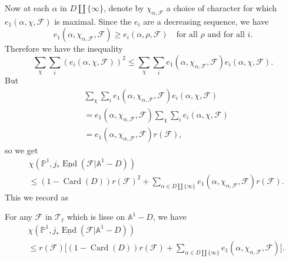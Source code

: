 Now at each \(\alpha\) in \(D\amalg\{\infty\}\), denote by
\(\chi_{\alpha,\mathcal{F}}\) a choice of character for which
\(e_1(\alpha,\chi,\mathcal{F})\) is maximal. Since the \(e_i\) are a
decreasing sequence, we have
\[
  e_1(\alpha,\chi_{\alpha,\mathcal{F}},\mathcal{F})
  \geq e_i(\alpha,\rho,\mathcal{F})\quad
  \text{for all \(\rho\) and for all \(i\)}.
\]
Therefore we have the inequality
\[
  \sum_\chi\sum_i(e_i(\alpha,\chi,\mathcal{F}))^2
  \leq
  \sum_\chi\sum_i
  e_1(\alpha,\chi_{\alpha,\mathcal{F}},\mathcal{F})
  e_i(\alpha,\chi,\mathcal{F}).
\]
But
\[
\begin{aligned}
  &\sum_\chi\sum_i
  e_1(\alpha,\chi_{\alpha,\mathcal{F}},\mathcal{F})
  e_i(\alpha,\chi,\mathcal{F})\\
  &=
  e_1(\alpha,\chi_{\alpha,\mathcal{F}},\mathcal{F})
  \sum_\chi\sum_i e_i(\alpha,\chi,\mathcal{F})\\
  &=e_1(\alpha,\chi_{\alpha,\mathcal{F}},\mathcal{F})r(\mathcal{F}),
\end{aligned}
\]
so we get
\[
\begin{aligned}
  &\chi(\mathbb{P}^1,j_*\underline{\operatorname{End}}(\mathcal{F}\vert\mathbb{A}^1-D))\\
  &\leq
  (1-\operatorname{Card}(D))r(\mathcal{F})^2
  +
  \sum_{\alpha\in D\amalg\{\infty\}}
  e_1(\alpha,\chi_{\alpha,\mathcal{F}},\mathcal{F})r(\mathcal{F}).
\end{aligned}
\]
This we record as

For any \(\mathcal{F}\) in \(\mathcal{T}_\ell\) which is lisse on
\(\mathbb{A}^1-D\), we have
\[
\begin{aligned}
  &\chi(\mathbb{P}^1,j_*\underline{\operatorname{End}}(\mathcal{F}\vert\mathbb{A}^1-D))\\
  &\leq
  r(\mathcal{F})\bigl[
  (1-\operatorname{Card}(D))r(\mathcal{F})
  +
  \sum_{\alpha\in D\amalg\{\infty\}}
  e_1(\alpha,\chi_{\alpha,\mathcal{F}},\mathcal{F})
  \bigr].
\end{aligned}
\]

